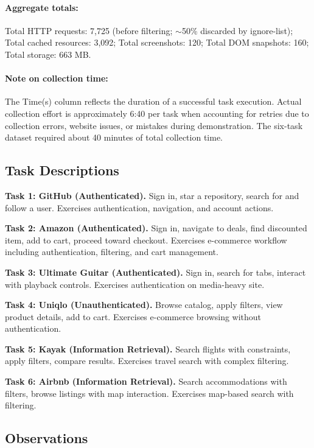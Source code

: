 \documentclass[letterpaper]{article}
\begin{document}
\paragraph{Aggregate totals:} Total HTTP requests: 7,725 (before filtering; $\sim$50\% discarded by ignore-list); Total cached resources: 3,092; Total screenshots: 120; Total DOM snapshots: 160; Total storage: 663 MB.

\paragraph{Note on collection time:} The Time(s) column reflects the duration of a successful task execution. Actual collection effort is approximately 6:40 per task when accounting for retries due to collection errors, website issues, or mistakes during demonstration. The six-task dataset required about 40 minutes of total collection time.

\subsection{Task Descriptions}

\textbf{Task 1: GitHub (Authenticated).} Sign in, star a repository, search for and follow a user. Exercises authentication, navigation, and account actions.

\textbf{Task 2: Amazon (Authenticated).} Sign in, navigate to deals, find discounted item, add to cart, proceed toward checkout. Exercises e-commerce workflow including authentication, filtering, and cart management.

\textbf{Task 3: Ultimate Guitar (Authenticated).} Sign in, search for tabs, interact with playback controls. Exercises authentication on media-heavy site.

\textbf{Task 4: Uniqlo (Unauthenticated).} Browse catalog, apply filters, view product details, add to cart. Exercises e-commerce browsing without authentication.

\textbf{Task 5: Kayak (Information Retrieval).} Search flights with constraints, apply filters, compare results. Exercises travel search with complex filtering.

\textbf{Task 6: Airbnb (Information Retrieval).} Search accommodations with filters, browse listings with map interaction. Exercises map-based search with filtering.

\subsection{Observations}
\end{document}
